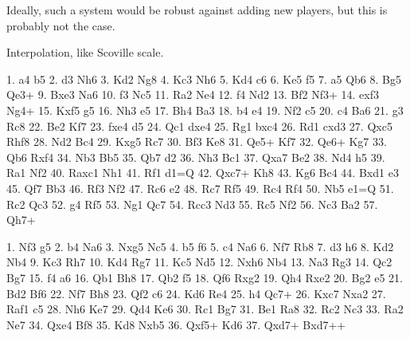 \documentclass[10pt,preprint,twocolumn]{acmart}
\begin{document}
Ideally, such a system would be robust against adding new players,
but this is probably not the case.


% 

Interpolation, like Scoville scale.


1. a4 b5 2. d3 Nh6 3. Kd2 Ng8 4. Kc3 Nh6
5. Kd4 c6 6. Ke5 f5 7. a5 Qb6 8. Bg5 Qe3+
9. Bxe3 Na6 10. f3 Nc5 11. Ra2 Ne4 12. f4 Nd2
13. Bf2 Nf3+ 14. exf3 Ng4+ 15. Kxf5 g5 16. Nh3 e5
17. Bh4 Ba3 18. b4 e4 19. Nf2 c5 20. c4 Ba6
21. g3 Rc8 22. Be2 Kf7 23. fxe4 d5 24. Qc1 dxe4
25. Rg1 bxc4 26. Rd1 cxd3 27. Qxc5 Rhf8 28. Nd2 Bc4
29. Kxg5 Rc7 30. Bf3 Ke8 31. Qe5+ Kf7 32. Qe6+ Kg7
33. Qb6 Rxf4 34. Nb3 Bb5 35. Qb7 d2 36. Nh3 Bc1
37. Qxa7 Be2 38. Nd4 h5 39. Ra1 Nf2 40. Raxc1 Nh1
41. Rf1 d1=Q 42. Qxc7+ Kh8 43. Kg6 Bc4 44. Bxd1 e3
45. Qf7 Bb3 46. Rf3 Nf2 47. Rc6 e2 48. Rc7 Rf5
49. Rc4 Rf4 50. Nb5 e1=Q 51. Rc2 Qc3 52. g4 Rf5
53. Ng1 Qc7 54. Rcc3 Nd3 55. Rc5 Nf2 56. Nc3 Ba2
57. Qh7+

1. Nf3 g5 2. b4 Na6 3. Nxg5 Nc5 4. b5 f6
5. c4 Na6 6. Nf7 Rb8 7. d3 h6 8. Kd2 Nb4
9. Kc3 Rh7 10. Kd4 Rg7 11. Kc5 Nd5 12. Nxh6 Nb4
13. Na3 Rg3 14. Qc2 Bg7 15. f4 a6 16. Qb1 Bh8
17. Qb2 f5 18. Qf6 Rxg2 19. Qh4 Rxe2 20. Bg2 e5
21. Bd2 Bf6 22. Nf7 Bh8 23. Qf2 c6 24. Kd6 Re4
25. h4 Qc7+ 26. Kxc7 Nxa2 27. Raf1 c5 28. Nh6 Ke7
29. Qd4 Ke6 30. Rc1 Bg7 31. Be1 Ra8 32. Rc2 Nc3
33. Ra2 Ne7 34. Qxe4 Bf8 35. Kd8 Nxb5 36. Qxf5+ Kd6
37. Qxd7+ Bxd7++




\end{document}
